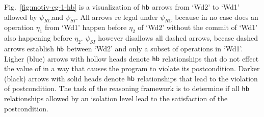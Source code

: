 Fig.~\ref{fig:motiv-eg-1-hb} is a visualization of $\textsf{hb}$ arrows
from `Wd2' to `Wd1' allowed by $\psi_{RC}$and $\psi_{SI}$. All
arrows re legal under $\psi_{RC}$ because in no case does an operation
$\eta_1$ from `Wd1' happen before $\eta_2$ of `Wd2' without the commit
of `Wd1' also happening before $\eta_2$. $\psi_{SI}$ however disallows
all dashed arrows, becase dashed arrows establish $\textsf{hb}$ between `Wd2'
and only a subset of operations in `Wd1'. Ligher (blue) arrows with
hollow heads denote $\textsf{hb}$ relationships that do not effect the value
of  in a way that causes the program to violate its
postcondition.  Darker (black) arrows with solid heads denote $\textsf{hb}$
relationships that lead to the violation of postcondition. The task of
the reasoning framework is to determine if all $\textsf{hb}$ relationships
allowed by an isolation level lead to the satisfaction of the
postcondition.


